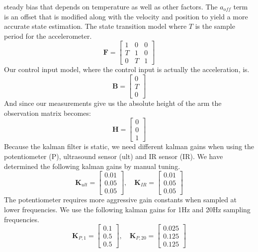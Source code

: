 steady bias that depends on temperature as well as other factors. The \(a_{off}\) term is an offset that is modified along
with the velocity and position to yield a more accurate state estimation.
The state transition model where \(T\) is the sample period for the accelerometer.
\begin{equation*}
	\mathbf{F} = \begin{bmatrix}
		1 & 0 & 0 \\
		T & 1 & 0 \\
		0 & T & 1 
	\end{bmatrix}
\end{equation*}
Our control input model, where the control input is actually the acceleration, is.
\begin{equation*}
	\mathbf{B} = \begin{bmatrix}
		0 \\
		T \\
		0 
	\end{bmatrix}
\end{equation*}
And since our measurements give us the absolute height of the arm the observation matrix becomes:
\begin{equation*}
	\mathbf{H} = \begin{bmatrix}
		0 \\
		0 \\
		1
	\end{bmatrix}
\end{equation*}
Because the kalman filter is static, we need different kalman gains when using the potentiometer (P), ultrasound sensor (ult) and IR sensor (IR).
We have determined the following kalman gains by manual tuning.
\begin{equation*}
	\mathbf{K}_{ult} = \begin{bmatrix}
		0.01 \\
		0.05 \\
		0.05 
	\end{bmatrix}, \quad
	\mathbf{K}_{IR} = \begin{bmatrix}
		0.01 \\
		0.05 \\
		0.05 
	\end{bmatrix}
\end{equation*}
The potentiometer requires more aggressive gain constants when sampled at lower frequencies. We use the following kalman gains for 1Hz
and 20Hz sampling frequencies. 
\begin{equation*}
	\mathbf{K}_{P,1} = \begin{bmatrix}
		0.1 \\
		0.5 \\
		0.5 
	\end{bmatrix},\quad
	\mathbf{K}_{P,20} = \begin{bmatrix}
		0.025 \\
		0.125 \\
		0.125 
	\end{bmatrix}
\end{equation*}

